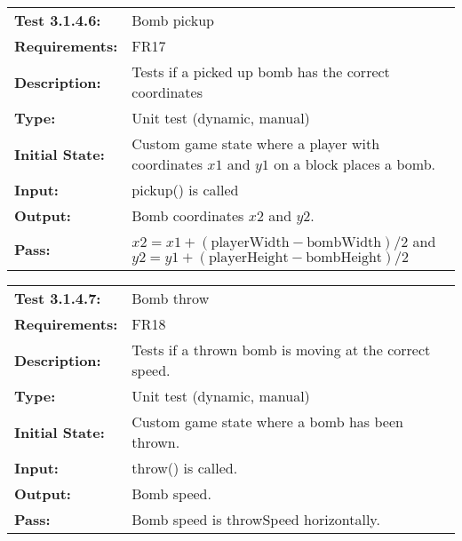 \documentclass[12pt, titlepage]{article}
\begin{document}
\begin{tabular}{|l|p{10cm}|}
    \hline
    \bf{Test} 3.1.4.6: & Bomb pickup \\
    \bf{Requirements}: & FR17 \\
    \bf{Description}: &  Tests if a picked up bomb has the correct coordinates \\
    \bf{Type}: & Unit test (dynamic, manual) \\
    \bf{Initial State}: & Custom game state where a player with coordinates $x1$ and $y1$ on a block places a bomb. \\
    \bf{Input}: & pickup() is called \\
    \bf{Output}: & Bomb coordinates $x2$ and $y2$. \\
    \bf{Pass}: & $x2 = x1 + (\text{playerWidth} - \text{bombWidth})/2$ and $y2 = y1 + (\text{playerHeight} - \text{bombHeight})/2$ \\
    \hline
\end{tabular}


\begin{tabular}{|l|p{10cm}|}
    \hline
    \bf{Test} 3.1.4.7: & Bomb throw \\
    \bf{Requirements}: & FR18 \\
    \bf{Description}: & Tests if a thrown bomb is moving at the correct speed. \\
    \bf{Type}: & Unit test (dynamic, manual) \\
    \bf{Initial State}: & Custom game state where a bomb has been thrown. \\
    \bf{Input}: & throw() is called. \\
    \bf{Output}: & Bomb speed. \\
    \bf{Pass}: & Bomb speed is throwSpeed horizontally. \\
    \hline
\end{tabular}
\end{document}
